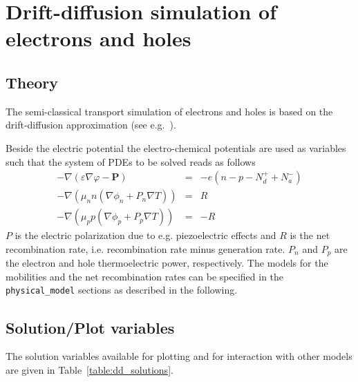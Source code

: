 \chapter{Drift-diffusion simulation of electrons and holes}

\section{Theory}

The semi-classical transport simulation of electrons and holes is based on the drift-diffusion approximation (see e.g.~\cite{selberherr84}).

Beside the electric potential the electro-chemical potentials are used as variables such that the system of PDEs to be solved reads as follows
\begin{eqnarray}
-\nabla(\varepsilon\nabla\varphi - \mathbf{P}) & = & -e(n - p - N_d^+ + N_a^-) \nonumber \\
-\nabla(\mu_n n ( \nabla\phi_n + P_n \nabla T)  ) & = & R \\
-\nabla(\mu_p p (\nabla\phi_p + P_p \nabla T) ) & = & -R \nonumber
\end{eqnarray}
$P$ is the electric polarization due to e.g. piezoelectric effects and $R$ is the net recombination rate, i.e. recombination rate minus generation rate. $P_n$ and $P_p$ are the electron and hole thermoelectric power, respectively.
The models for the mobilities and the net recombination rates can be specified in the \texttt{physical\_model} sections as described in the following.


\section{Solution/Plot variables}

The solution variables available for plotting and for interaction with other models are given in Table~\ref{table:dd_solutions}.


